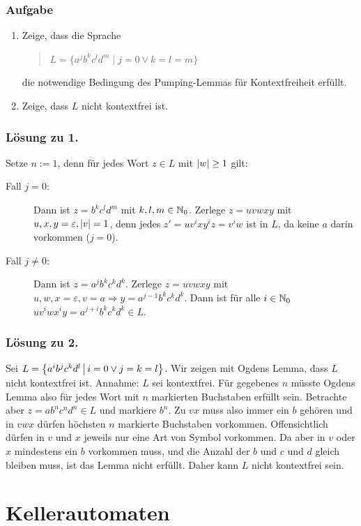 \begin{frame}
\frametitle{Aufgabe}
\begin{enumerate}
  \item 
        Zeige, dass die Sprache
	\begin{quote}
	  $L = \{a^j b^k c^l d^m \mid j=0 \vee k=l=m\}$
	\end{quote}
	die notwendige Bedingung des Pumping-Lemmas für Kontextfreiheit
	erfüllt.
  \item Zeige, dass $L$ nicht kontextfrei ist.
\end{enumerate}
\end{frame}

\begin{frame}
\frametitle{Lösung zu 1.}

Setze $n := 1$, denn für jedes Wort $z \in L$ mit $\left\vert w \right\vert \geq 1$ gilt:

\begin{description}
	\item[Fall $j = 0$:] Dann ist $z = b^kc^ld^m$ mit $k, l, m \in \mathbb{N}_0$. Zerlege $z = uvwxy$ mit $u, x, y = \varepsilon, \left\vert v \right\vert = 1$, denn jedes $z'=uv^ixy^iz = v^iw$ ist in $L$, da keine $a$ darin vorkommen ($j=0$).
	\item[Fall $j \neq 0$:] Dann ist $z=a^jb^kc^kd^k$. Zerlege $z = uvwxy$ mit $u,w, x = \varepsilon, v = a \Rightarrow y = a^{j-1}b^kc^kd^k$. Dann ist für alle $i \in \mathbb{N}_0$ $uv^iwx^iy = a^{j+i}b^kc^kd^k \in L$.
\end{description}

\end{frame}

\begin{frame}
\frametitle{Lösung zu 2.}
Sei $L = \left\lbrace a^ib^jc^kd^l \,\middle\vert\, i = 0 \vee j = k = l \right\rbrace$. Wir zeigen mit Ogdens Lemma, dass $L$ nicht kontextfrei ist. \micropause
Annahme: $L$ sei kontextfrei. Für gegebenes $n$ müsste Ogdens Lemma also für jedes Wort mit $n$ markierten Buchstaben erfüllt sein. \micropause
Betrachte aber $z = ab^nc^nd^n \in L$ und markiere $b^n$. \micropause
Zu $vx$ muss also immer ein $b$ gehören und in $vwx$ dürfen höchsten $n$ markierte Buchstaben vorkommen. Offensichtlich dürfen in $v$ und $x$ jeweils nur eine Art von Symbol vorkommen. Da aber in $v$ oder $x$ mindestens ein $b$ vorkommen muss, und die Anzahl der $b$ und $c$ und $d$ gleich bleiben muss, ist das Lemma nicht erfüllt. Daher kann $L$ nicht kontextfrei sein.
\end{frame}

\section{Kellerautomaten}
